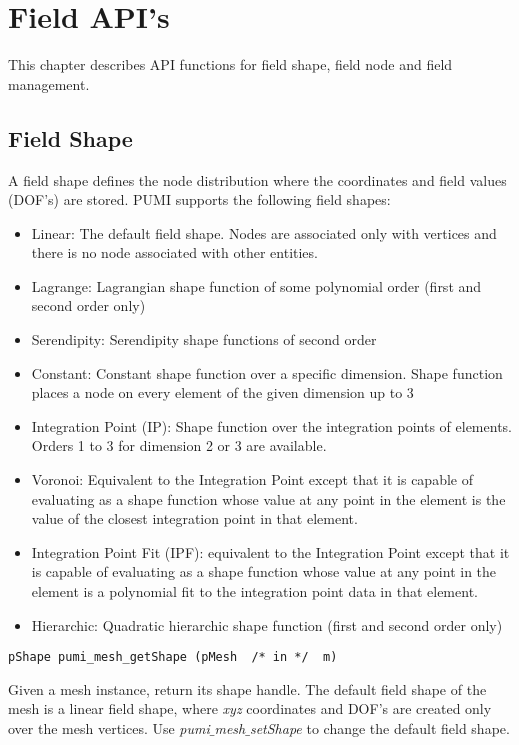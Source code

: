 \section{Field API's}

This chapter describes API functions for field shape, field node and field management.

\subsection{Field Shape}\label{sec:fieldshape}
A field shape defines the node distribution where the coordinates and field values (DOF's) are stored. PUMI supports the following field shapes: 

\begin{itemize}
\item Linear: The default field shape. Nodes are associated only with vertices and there is no node associated with other entities.
\item Lagrange: Lagrangian shape function of some polynomial order (first and second order only)
\item Serendipity: Serendipity shape functions of second order
\item Constant: Constant shape function over a specific dimension. Shape function places a node on every element
 of the given dimension up to 3
\item Integration Point (IP): Shape function over the integration points of elements. Orders 1 to 3 for dimension 2 or 3 are available. 
\item Voronoi: Equivalent to the Integration Point except that it is capable of evaluating as a shape function whose
           value at any point in the element is the value of the closest integration point in that element.
\item Integration Point Fit (IPF): equivalent to the Integration Point except that it is capable of evaluating as a shape function whose value at any point in the element is a polynomial fit to the integration point data in that element.
\item Hierarchic: Quadratic hierarchic shape function (first and second order only)
\end{itemize}

\begin{verbatim}
pShape pumi_mesh_getShape (pMesh  /* in */  m)
\end{verbatim}\vspace{-.5cm}\hspace{1cm}
Given a mesh instance, return its shape handle. The default field shape of the mesh is a linear field shape, where \emph{xyz} coordinates and DOF's are created only over the mesh vertices. Use \emph{pumi$\_$mesh$\_$setShape} to change the default field shape.


